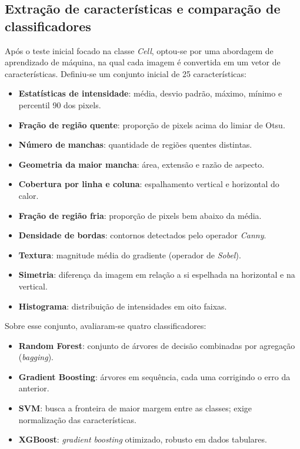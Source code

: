 \documentclass[a4paper,11pt]{article}
\begin{document}
\subsection{Extração de características e comparação de classificadores}

Após o teste inicial focado na classe \textit{Cell}, optou-se por uma abordagem de aprendizado de máquina, na qual cada imagem é convertida em um vetor de características. Definiu-se um conjunto inicial de 25 características:

\begin{itemize}[noitemsep]
	\item \textbf{Estatísticas de intensidade}: média, desvio padrão, máximo, mínimo e percentil 90 dos pixels.
	\item \textbf{Fração de região quente}: proporção de pixels acima do limiar de Otsu.
	\item \textbf{Número de manchas}: quantidade de regiões quentes distintas.
	\item \textbf{Geometria da maior mancha}: área, extensão e razão de aspecto.
	\item \textbf{Cobertura por linha e coluna}: espalhamento vertical e horizontal do calor.
	\item \textbf{Fração de região fria}: proporção de pixels bem abaixo da média.
	\item \textbf{Densidade de bordas}: contornos detectados pelo operador \textit{Canny}.
	\item \textbf{Textura}: magnitude média do gradiente (operador de \textit{Sobel}).
	\item \textbf{Simetria}: diferença da imagem em relação a si espelhada na horizontal e na vertical.
	\item \textbf{Histograma}: distribuição de intensidades em oito faixas.
\end{itemize}

Sobre esse conjunto, avaliaram-se quatro classificadores:

\begin{itemize}[noitemsep]
	\item \textbf{Random Forest}: conjunto de árvores de decisão combinadas por agregação (\textit{bagging}).
	\item \textbf{Gradient Boosting}: árvores em sequência, cada uma corrigindo o erro da anterior.
	\item \textbf{SVM}: busca a fronteira de maior margem entre as classes; exige normalização das características.
	\item \textbf{XGBoost}: \textit{gradient boosting} otimizado, robusto em dados tabulares.
\end{itemize}
\end{document}
